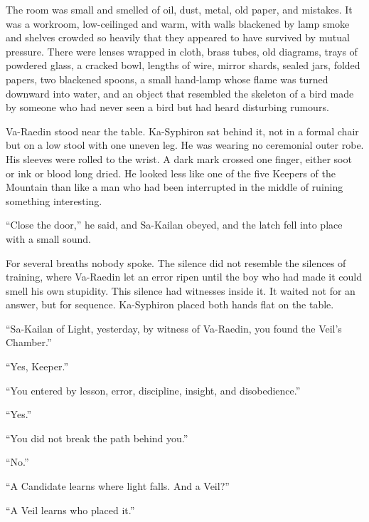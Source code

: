 



The room was small and smelled of oil, dust, metal, old paper, and mistakes.
It was a workroom, low-ceilinged and warm, with walls blackened by lamp smoke and shelves crowded so heavily that they appeared to have survived by mutual pressure.
There were lenses wrapped in cloth, brass tubes, old diagrams, trays of powdered glass, a cracked bowl, lengths of wire, mirror shards, sealed jars, folded papers, two blackened spoons, a small hand-lamp whose flame was turned downward into water, and an object that resembled the skeleton of a bird made by someone who had never seen a bird but had heard disturbing rumours.\par

Va-Raedin stood near the table.
Ka-Syphiron sat behind it, not in a formal chair but on a low stool with one uneven leg.
He was wearing no ceremonial outer robe.
His sleeves were rolled to the wrist.
A dark mark crossed one finger, either soot or ink or blood long dried.
He looked less like one of the five Keepers of the Mountain than like a man who had been interrupted in the middle of ruining something interesting.\par

“Close the door,” he said, and Sa-Kailan obeyed, and the latch fell into place with a small sound.\par

For several breaths nobody spoke.
The silence did not resemble the silences of training, where Va-Raedin let an error ripen until the boy who had made it could smell his own stupidity.
This silence had witnesses inside it.
It waited not for an answer, but for sequence.
Ka-Syphiron placed both hands flat on the table.\par




“Sa-Kailan of Light, yesterday, by witness of Va-Raedin, you found the Veil’s Chamber.”\par
“Yes, Keeper.”\par
“You entered by lesson, error, discipline, insight, and disobedience.”\par
“Yes.”\par
“You did not break the path behind you.”\par
“No.”\par
“A Candidate learns where light falls. And a Veil?”\par
“A Veil learns who placed it.”\par

